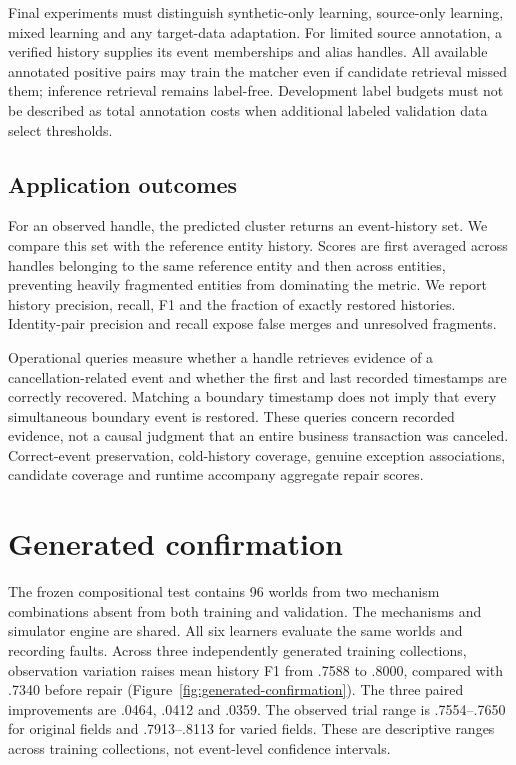 \documentclass[11pt]{article}
\begin{document}
Final experiments must distinguish synthetic-only learning, source-only learning, mixed learning and any target-data adaptation. For limited source annotation, a verified history supplies its event memberships and alias handles. All available annotated positive pairs may train the matcher even if candidate retrieval missed them; inference retrieval remains label-free. Development label budgets must not be described as total annotation costs when additional labeled validation data select thresholds.

\subsection{Application outcomes}
For an observed handle, the predicted cluster returns an event-history set. We compare this set with the reference entity history. Scores are first averaged across handles belonging to the same reference entity and then across entities, preventing heavily fragmented entities from dominating the metric. We report history precision, recall, F1 and the fraction of exactly restored histories. Identity-pair precision and recall expose false merges and unresolved fragments.

Operational queries measure whether a handle retrieves evidence of a cancellation-related event and whether the first and last recorded timestamps are correctly recovered. Matching a boundary timestamp does not imply that every simultaneous boundary event is restored. These queries concern recorded evidence, not a causal judgment that an entire business transaction was canceled. Correct-event preservation, cold-history coverage, genuine exception associations, candidate coverage and runtime accompany aggregate repair scores.

\section{Generated confirmation}
The frozen compositional test contains 96 worlds from two mechanism combinations absent from both training and validation. The mechanisms and simulator engine are shared. All six learners evaluate the same worlds and recording faults. Across three independently generated training collections, observation variation raises mean history F1 from .7588 to .8000, compared with .7340 before repair (Figure~\ref{fig:generated-confirmation}). The three paired improvements are .0464, .0412 and .0359. The observed trial range is .7554--.7650 for original fields and .7913--.8113 for varied fields. These are descriptive ranges across training collections, not event-level confidence intervals.
\end{document}
